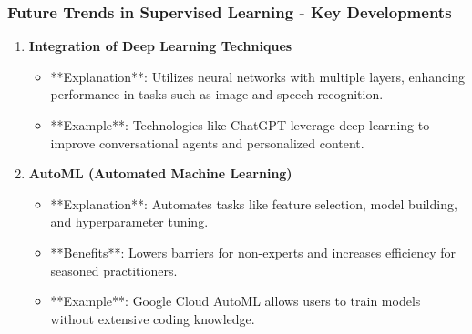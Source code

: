 \documentclass[aspectratio=169]{beamer}
\begin{document}
\begin{frame}[fragile]
    \frametitle{Future Trends in Supervised Learning - Key Developments}
    \begin{enumerate}
        \item \textbf{Integration of Deep Learning Techniques}
            \begin{itemize}
                \item **Explanation**: Utilizes neural networks with multiple layers, enhancing performance in tasks such as image and speech recognition.
                \item **Example**: Technologies like ChatGPT leverage deep learning to improve conversational agents and personalized content.
            \end{itemize}
        
        \item \textbf{AutoML (Automated Machine Learning)}
            \begin{itemize}
                \item **Explanation**: Automates tasks like feature selection, model building, and hyperparameter tuning.
                \item **Benefits**: Lowers barriers for non-experts and increases efficiency for seasoned practitioners.
                \item **Example**: Google Cloud AutoML allows users to train models without extensive coding knowledge.
            \end{itemize}
    \end{enumerate}
\end{frame}
\end{document}
